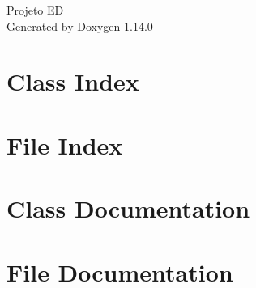 \documentclass[twoside]{book}
\newcommand{\+}{\discretionary{\mbox{\scriptsize$\hookleftarrow$}}{}{}}
\newcommand{\clearemptydoublepage}{%
    \newpage{\pagestyle{empty}\cleardoublepage}%
  }
\begin{document}
  \raggedbottom
    \hypersetup{pageanchor=false,
                bookmarksnumbered=true,
                pdfencoding=unicode
               }
  \begin{titlepage}
  \vspace*{7cm}
  \begin{center}%
  {\Large Projeto ED}\\
  \vspace*{1cm}
  {\large Generated by Doxygen 1.14.0}\\
  \end{center}
  \end{titlepage}
  \clearemptydoublepage
  \tableofcontents
  \clearemptydoublepage
  \hypersetup{pageanchor=true}
\chapter{Class Index}

\chapter{File Index}

\chapter{Class Documentation}





















\chapter{File Documentation}




























\end{document}
